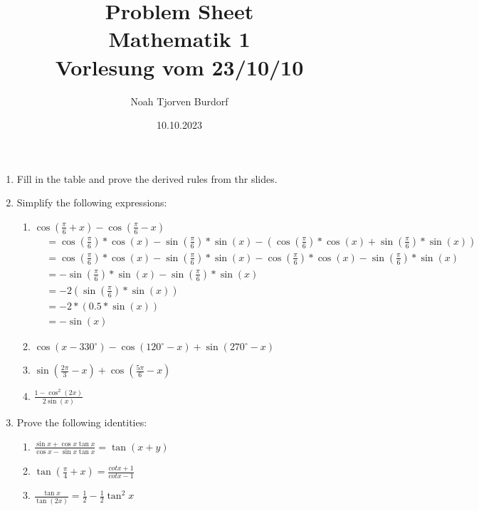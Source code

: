 \documentclass[a4paper,onecolumn,draft,pdftex]{report}
\begin{document}
    \author{Noah Tjorven Burdorf}
    \title{Problem Sheet \\ Mathematik 1 \\ Vorlesung vom 23/10/10}
    \date{10.10.2023}
    \maketitle

    \overfullrule=0pt

    \begin{enumerate}
        \item Fill in the table and prove the derived rules from thr slides.
        \item Simplify the following expressions:
            \begin{enumerate}
                \item $\cos(\frac{\pi}{6}+x)-\cos(\frac{\pi}{6}-x)$
                \begin{align*}
                    &= \cos(\frac{\pi}{6})*\cos(x)-\sin(\frac{\pi}{6})*\sin(x)-(\cos(\frac{\pi}{6})*\cos(x)+\sin(\frac{\pi}{6})*\sin(x)) \\
                    &= \cos(\frac{\pi}{6})*\cos(x)-\sin(\frac{\pi}{6})*\sin(x)-\cos(\frac{\pi}{6})*\cos(x)-\sin(\frac{\pi}{6})*\sin(x) \\
                    &= -\sin(\frac{\pi}{6})*\sin(x)-\sin(\frac{\pi}{6})*\sin(x) \\
                    &= -2(\sin(\frac{\pi}{6})*\sin(x)) \\
                    &= -2*(0.5*\sin(x)) \\
                    &= -\sin(x)
                \end{align*}
                \item $\cos(x-330^\circ)-\cos(120^\circ-x)+\sin(270^\circ-x)$
                \item $\sin(\frac{2\pi}{3}-x)+\cos(\frac{5\pi}{6}-x)$
                \item $\frac{1-\cos^2(2x)}{2\sin(x)}$
            \end{enumerate}
        \item Prove the following identities:
            \begin{enumerate}
                \item $\frac{\sin x+\cos x\tan x}{\cos x-\sin x\tan x} = \tan(x+y)$
                \item $\tan(\frac{\pi}{4}+x)=\frac{cot x+1}{cot x-1}$
                \item $\frac{\tan x}{\tan(2x)}=\frac{1}{2}-\frac{1}{2}\tan^2 x$

\end{enumerate}
\end{enumerate}
\end{document}
